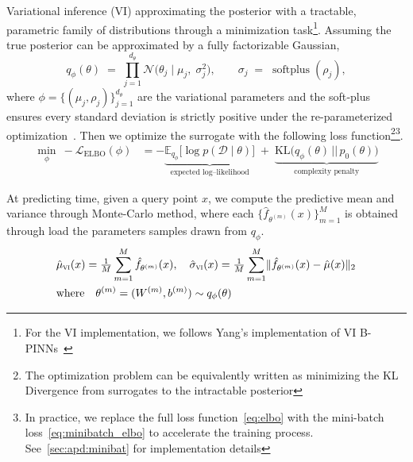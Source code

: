 \documentclass[preprint,12pt]{elsarticle}
\begin{document}
Variational inference (VI) approximating the posterior with a tractable, parametric family of distributions through a minimization task\footnote{For the VI implementation, we follows Yang's implementation of VI B-PINNs~\cite{yang_b-pinns_2021}}. Assuming the true posterior can be approximated by a fully factorizable Gaussian, 
\begin{equation}
  q_{\phi}(\theta)
  \;=\;
  \prod_{j=1}^{d_\theta}
  \mathcal N\!\bigl(\theta_j \mid \mu_j,\;\sigma_j^{2}\bigr),
  \qquad
  \sigma_j \;=\; \operatorname{softplus}(\rho_j),
  \label{eq:mf_gaussian}
\end{equation}
where $\phi=\{(\mu_j,\rho_j)\}_{j=1}^{d_\theta}$ are the variational
parameters and the soft‐plus ensures every standard deviation is strictly
positive under the re-parameterized optimization~\cite{blundell_weight_2015}. 
Then we optimize the surrogate with the following loss function\footnote{The optimization problem can be equivalently written as minimizing the KL Divergence from surrogates to the intractable posterior}\footnote{In practice, we replace the full loss function~\eqref{eq:elbo} with the mini-batch loss~\eqref{eq:minibatch_elbo} to accelerate the training process. See~\ref{sec:apd:minibat} for implementation details}.
\begin{align}
  \min_{\phi}\ - \mathcal L_{\mathrm{ELBO}}(\phi) 
  &= -
     \underbrace{\mathbb E_{q_{\phi}}
       \!\bigl[\log p(\mathcal D\mid\theta)\bigr]}_{\text{expected log–likelihood}}
     \;+\;
     \underbrace{\mathrm{KL}\!\bigl(q_{\phi}(\theta)\,||\,p_{0}(\theta)\bigr)}_{\text{complexity penalty}}
  \label{eq:elbo}
\end{align}

At predicting time, given a query point $x$, we compute the predictive mean and variance through Monte-Carlo method, where each $\{\hat f_{\theta^{(m)}}(x)\}_{m=1}^{M}$ is obtained through load the parameters samples drawn from $q_{\phi}$. 
\begin{equation}
    \begin{aligned}
    &\hat\mu_{\textsc{vi}}(x)=\tfrac1M\sum_{m=1}^{M}\hat f_{\theta^{(m)}}(x),
    \quad
    \hat\sigma_{\textsc{vi}}(x)=
    \tfrac1{M}\sum_{m=1}^{M}
    \lVert \hat f_{\theta^{(m)}}(x)-\hat\mu(x)\rVert_2 \\
    &\text{where} \quad
    \theta^{(m)} = (W^{(m)}, b^{(m)}) \sim q_{\phi}(\theta) 
    \label{eq:vimc_mv}
    \end{aligned}
\end{equation}
\noindent
\end{document}
